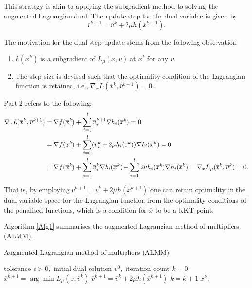 This strategy is akin to applying the subgradient method to solving the augmented Lagrangian dual. The update step for the dual variable is given by 
$$
\overline{v}^{k+1} = \overline{v}^k + 2\mu h(\overline{x}^{k+1}). 
$$

The motivation for the dual step update stems from the following observation:
%
\begin{enumerate}
\item $h(\overline{x}^k)$ is a subgradient of $L_\mu(x,v)$ at $\overline{x}^k$ for any $v$.
\item The step size is devised such that the optimality condition of the Lagrangian function is retained, i.e., $\nabla_x L(\overline{x}^k,\overline{v}^{k+1}) = 0$.
\end{enumerate}

Part 2 refers to the following:
%
\begin{align*}
\nabla_x L(\overline{x}^k,\overline{v}^{k+1}) & =  \nabla f(\overline{x}^k) + \sum_{i=1}^l\overline{v}^{k+1}_i\nabla h_i(\overline{x}^k) = 0 \\
& = \nabla f(\overline{x}^k)  + \sum_{i=1}^l(\overline{v}_i^{k} + 2\mu h_i(\overline{x}^k))\nabla h_i(\overline{x}^k) = 0 \\
& = \nabla f(\overline{x}^k) + \sum_{i=1}^l\overline{v}_i^{k}\nabla h_i(\overline{x}^k)\hspace{-1pt} + \sum_{i=1}^l2\mu h_i(\overline{x}^k)\nabla h_i(\overline{x}^k) = \nabla_x L_\mu(\overline{x}^k,\overline{v}^{k})=0.
\end{align*}

That is, by employing $\overline{v}^{k+1} = \overline{v}^k + 2\mu h(\overline{x}^{k+1})$ one can retain optimality in the dual variable space for the Lagrangian function from the optimality conditions of the penalised functions, which is a condition for $\overline{x}$ to be a KKT point. 

Algorithm \ref{Alg1} summarises the augmented Lagrangian method of multipliers (ALMM). 

\begin{algorithm}[H]
\caption{Augmented Lagrangian method of multipliers (ALMM)} \label{Alg1}
\begin{algorithmic}[1] %
 tolerance $\epsilon > 0,$ initial dual solution $v^0,$ iteration count $k = 0$  
        \State $\overline{x}^{k+1} = \arg\min L_\mu(x,\overline{v}^k)$
        \State $\overline{v}^{k+1} = \overline{v}^{k} + 2\mu h(\overline{x}^{k+1})$
    \State $k = k+1$
\EndWhile
{} $x^k$.
\end{algorithmic}
\end{algorithm}

